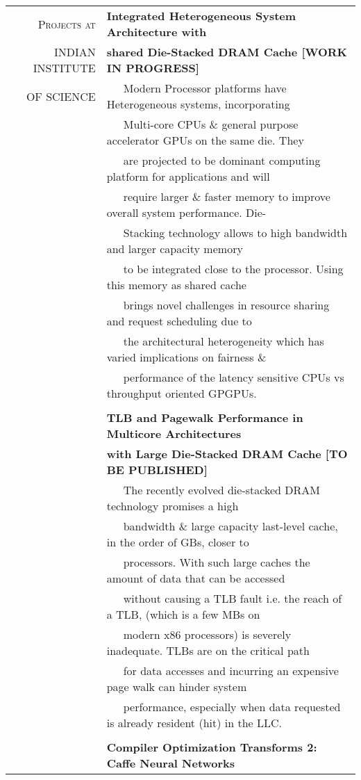 \documentclass[a4paper,10pt]{article} %
\begin{document}
\begin{tabular}{rl}
\textsc{Projects at} & \textbf{Integrated Heterogeneous System Architecture with} \\
\textsc{INDIAN INSTITUTE} & \textbf{shared Die-Stacked DRAM Cache [WORK IN PROGRESS]} \\
\textsc{OF SCIENCE} & ~~~Modern Processor platforms have Heterogeneous systems, incorporating\\
& ~~~Multi-core CPUs \& general purpose accelerator GPUs on the same die. They\\
& ~~~are projected to be dominant computing platform for applications and will\\
& ~~~require larger \& faster memory to improve overall system performance. Die-\\
& ~~~Stacking technology allows to high bandwidth and larger capacity memory\\
& ~~~to be integrated close to the processor. Using this memory as shared cache\\
& ~~~brings novel challenges in resource sharing and request scheduling due to\\
& ~~~the architectural heterogeneity which has varied implications on fairness \&\\
& ~~~performance of the latency sensitive CPUs vs throughput oriented GPGPUs.\\
& \\
& \textbf{TLB and Pagewalk Performance in Multicore Architectures} \\
& \textbf{with Large Die-Stacked DRAM Cache [TO BE PUBLISHED]}\\
& ~~~The recently evolved die-stacked DRAM technology promises a high\\
& ~~~bandwidth \& large capacity last-level cache, in the order of GBs, closer to \\
& ~~~processors. With such large caches the amount of data that can be accessed \\
& ~~~without causing a TLB fault i.e. the reach of a TLB, (which is a few MBs on \\
& ~~~modern x86 processors) is severely inadequate. TLBs are on the critical path \\
& ~~~for data accesses and incurring an expensive page walk can hinder system \\
& ~~~performance, especially when data requested is already resident (hit) in the LLC.\\
& \\
& \textbf{Compiler Optimization Transforms 2: Caffe Neural Networks}\\

\end{tabular}
\end{document}
